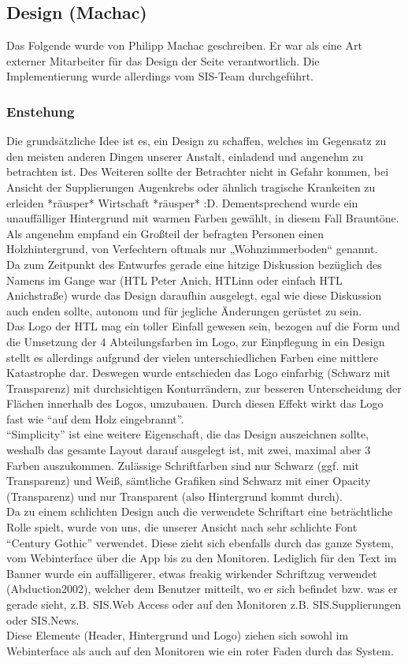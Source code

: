 \subsection{Design (Machac)}
\label{sec:content_design}
Das Folgende wurde von Philipp Machac geschreiben. Er war als eine Art externer Mitarbeiter für das Design der Seite verantwortlich. Die Implementierung wurde allerdings vom SIS-Team durchgeführt.
\subsubsection{Enstehung}
Die grundsätzliche Idee ist es, ein Design zu schaffen, welches im Gegensatz zu den meisten anderen Dingen unserer Anstalt, einladend und angenehm zu betrachten ist. Des Weiteren sollte der Betrachter nicht in Gefahr kommen, bei Ansicht der Supplierungen Augenkrebs oder ähnlich tragische Krankeiten zu erleiden *räusper* Wirtschaft *räusper* :D. Dementsprechend wurde ein unauffälliger Hintergrund mit warmen Farben gewählt, in diesem Fall Brauntöne. Als angenehm empfand ein Großteil der befragten Personen einen Holzhintergrund, von Verfechtern oftmals nur „Wohnzimmerboden“ genannt.\\
Da zum Zeitpunkt des Entwurfes gerade eine hitzige Diskussion bezüglich des Namens im Gange war (HTL Peter Anich, HTLinn oder einfach HTL Anichstraße) wurde das Design daraufhin ausgelegt, egal wie diese Diskussion auch enden sollte, autonom und für jegliche Änderungen gerüstet zu sein.\\
Das Logo der HTL mag ein toller Einfall gewesen sein, bezogen auf die Form und die Umsetzung der 4 Abteilungsfarben im Logo, zur Einpflegung in ein Design stellt es allerdings aufgrund der vielen unterschiedlichen Farben eine mittlere Katastrophe dar. Deswegen wurde entschieden das Logo einfarbig (Schwarz mit Transparenz) mit durchsichtigen Konturrändern, zur besseren Unterscheidung der Flächen innerhalb des Logos, umzubauen. Durch diesen Effekt wirkt das Logo fast wie \enquote{auf dem Holz eingebrannt}.\\
\enquote{Simplicity} ist eine weitere Eigenschaft, die das Design auszeichnen sollte, weshalb das gesamte Layout darauf ausgelegt ist, mit zwei, maximal aber 3 Farben auszukommen. Zulässige Schriftfarben sind nur Schwarz (ggf. mit Transparenz) und Weiß, sämtliche Grafiken sind Schwarz mit einer Opacity (Transparenz) und nur Transparent (also Hintergrund kommt durch).\\
Da zu  einem schlichten Design auch die verwendete Schriftart eine beträchtliche Rolle spielt, wurde von uns, die unserer Ansicht nach sehr schlichte Font \enquote{Century Gothic} verwendet. Diese zieht sich ebenfalls durch das ganze System, vom Webinterface über die App bis zu den Monitoren. Lediglich für den Text im Banner wurde ein auffälligerer, etwas freakig wirkender Schriftzug verwendet (Abduction2002), welcher dem Benutzer mitteilt, wo er sich befindet bzw. was er gerade sieht, z.B. SIS.Web Access oder auf den Monitoren z.B. SIS.Supplierungen oder SIS.News.\\
Diese Elemente (Header, Hintergrund und Logo) ziehen sich sowohl im Webinterface als auch auf den Monitoren wie ein roter Faden durch das System.\\
